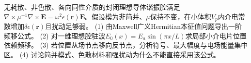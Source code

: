 无耗散、非色散、各向同性介质的封闭理想导体谐振腔满足\(\nabla\times\mu^{-1}\nabla\times\boldsymbol E=\omega^2\epsilon(\boldsymbol r)\boldsymbol E\)。假设模为非简并、\(\mu\)保持不变，在小体积\(V_p\)内介电常数增加\(\delta\epsilon(\boldsymbol r)\)且扰动足够弱。
(1) 由Maxwell广义Hermitian本征值问题导出一阶频移公式。
(2) 对一维理想腔驻波\(E_0(x)=E_a\sin(\pi x/L)\)求局部小介电片位置依赖频移。
(3) 若位置从场节点移向反节点，分析符号、最大幅度与电场能量集中区。
(4) 讨论简并模式、色散材料和强扰动为什么不能直接采用该公式。
